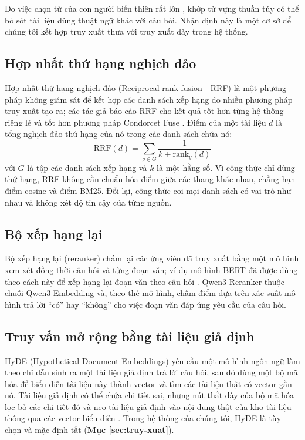 \bigbreak\noindent
Do việc chọn từ của con người biến thiên rất lớn \cite{furnas1987vocabulary}, khớp từ vựng thuần túy có thể bỏ sót tài liệu dùng thuật ngữ khác với câu hỏi. Nhận định này là một cơ sở để chúng tôi kết hợp truy xuất thưa với truy xuất dày trong hệ thống.

\subsection{Hợp nhất thứ hạng nghịch đảo}

Hợp nhất thứ hạng nghịch đảo (Reciprocal rank fusion - RRF) là một phương pháp không giám sát để kết hợp các danh sách xếp hạng do nhiều phương pháp truy xuất tạo ra; các tác giả báo cáo RRF cho kết quả tốt hơn từng hệ thống riêng lẻ và tốt hơn phương pháp Condorcet Fuse \cite{cormack2009rrf}. Điểm của một tài liệu $d$ là tổng nghịch đảo thứ hạng của nó trong các danh sách chứa nó:
\begin{equation}\label{eq:rrf-general}
    \mathrm{RRF}(d) = \sum_{g \in G} \frac{1}{k + \mathrm{rank}_g(d)}
\end{equation}
với $G$ là tập các danh sách xếp hạng và $k$ là một hằng số. Vì công thức chỉ dùng thứ hạng, RRF không cần chuẩn hóa điểm giữa các thang khác nhau, chẳng hạn điểm cosine và điểm BM25. Đổi lại, công thức coi mọi danh sách có vai trò như nhau và không xét độ tin cậy của từng nguồn.

\subsection{Bộ xếp hạng lại}

Bộ xếp hạng lại (reranker) chấm lại các ứng viên đã truy xuất bằng một mô hình xem xét đồng thời câu hỏi và từng đoạn văn; ví dụ mô hình BERT đã được dùng theo cách này để xếp hạng lại đoạn văn theo câu hỏi \cite{nogueira2019passage}. Qwen3-Reranker thuộc chuỗi Qwen3 Embedding \cite{zhang2025qwen3embedding} và, theo thẻ mô hình, chấm điểm dựa trên xác suất mô hình trả lời ``có'' hay ``không'' cho việc đoạn văn đáp ứng yêu cầu của câu hỏi.

\subsection{Truy vấn mở rộng bằng tài liệu giả định}

HyDE (Hypothetical Document Embeddings) \cite{gao2023hyde} yêu cầu một mô hình ngôn ngữ làm theo chỉ dẫn sinh ra một tài liệu giả định trả lời câu hỏi, sau đó dùng một bộ mã hóa để biểu diễn tài liệu này thành vector và tìm các tài liệu thật có vector gần nó. Tài liệu giả định có thể chứa chi tiết sai, nhưng nút thắt dày của bộ mã hóa lọc bỏ các chi tiết đó và neo tài liệu giả định vào nội dung thật của kho tài liệu thông qua các vector biểu diễn \cite{gao2023hyde}. Trong hệ thống của chúng tôi, HyDE là tùy chọn và mặc định tắt (\textbf{Mục \ref{sec:truy-xuat}}).

